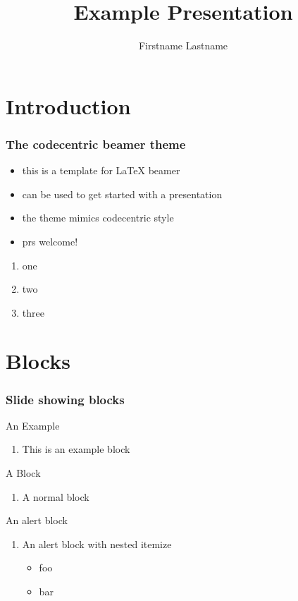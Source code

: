 \documentclass{beamer}
\author{Firstname Lastname}
\institute{codecentric AG}
\title{Example Presentation}
\begin{document}
{
  \begin{frame}
    \titlepage{}
  \end{frame}
}

\begin{frame}
  \tableofcontents
\end{frame}


\section{Introduction}

\begin{frame}
  \frametitle{The codecentric beamer theme}
  \begin{itemize}
  \item this is a template for LaTeX beamer
  \item can be used to get started with a presentation
  \item the theme mimics codecentric style
  \item prs welcome!
  \end{itemize}
  \begin{enumerate}
  \item one
  \item two
  \item three
  \end{enumerate}
\end{frame}

\section{Blocks}

\begin{frame}
  \frametitle{Slide showing blocks}
  \begin{exampleblock}{An Example}
    \begin{enumerate}
    \item This is an example block
    \end{enumerate}
  \end{exampleblock}
  \begin{block}{A Block}
    \begin{enumerate}
    \item A normal block
    \end{enumerate}
  \end{block}
  \begin{alertblock}{An alert block}
    \begin{enumerate}
    \item An alert block with nested itemize
      \begin{itemize}
      \item foo
      \item bar
      \end{itemize}
    \end{enumerate}
  \end{alertblock}
\end{frame}
\end{document}

